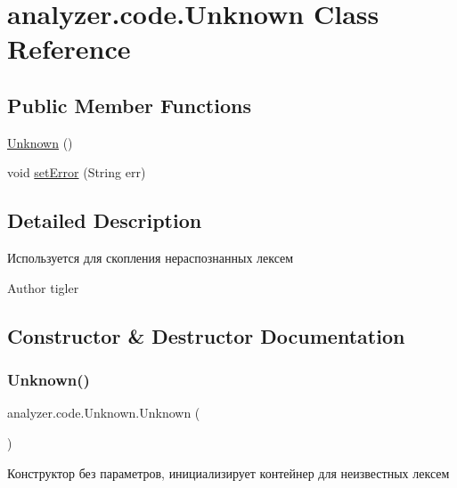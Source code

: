 \hypertarget{classanalyzer_1_1code_1_1Unknown}{}\section{analyzer.\+code.\+Unknown Class Reference}
\label{classanalyzer_1_1code_1_1Unknown}
\subsection*{Public Member Functions}
\begin{DoxyCompactItemize}
\item 
\hyperlink{classanalyzer_1_1code_1_1Unknown_a4ff369156174790c6388be27c0e56bef}{Unknown} ()
\item 
void \hyperlink{classanalyzer_1_1code_1_1Unknown_a7229e15dc0bba3a32526b47cf55e5e1e}{set\+Error} (String err)
\end{DoxyCompactItemize}


\subsection{Detailed Description}
Используется для скопления нераспознанных лексем \begin{DoxyAuthor}{Author}
tigler 
\end{DoxyAuthor}


\subsection{Constructor \& Destructor Documentation}
\mbox{\label{classanalyzer_1_1code_1_1Unknown_a4ff369156174790c6388be27c0e56bef}} 
\subsubsection{\texorpdfstring{Unknown()}{Unknown()}}
{\footnotesize\ttfamily analyzer.\+code.\+Unknown.\+Unknown (\begin{DoxyParamCaption}{ }\end{DoxyParamCaption})\hspace{0.3cm}{\ttfamily [inline]}}

Конструктор без параметров, инициализирует контейнер для неизвестных лексем 

